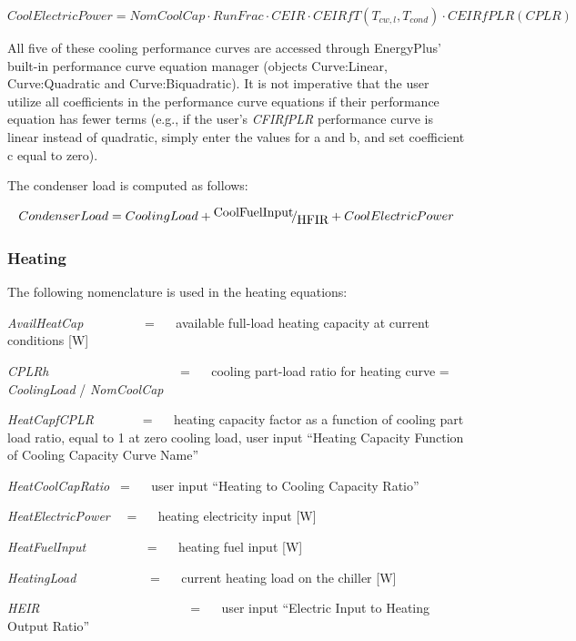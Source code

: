 \begin{equation}
CoolElectricPower = NomCoolCap \cdot RunFrac \cdot CEIR \cdot CEIRfT({T_{cw,l}},{T_{cond}}) \cdot CEIRfPLR(CPLR)
\end{equation}

All five of these cooling performance curves are accessed through EnergyPlus' built-in performance curve equation manager (objects Curve:Linear, Curve:Quadratic and Curve:Biquadratic). It is not imperative that the user utilize all coefficients in the performance curve equations if their performance equation has fewer terms (e.g., if the user's \emph{CFIRfPLR} performance curve is linear instead of quadratic, simply enter the values for a and b, and set coefficient c equal to zero).

The condenser load is computed as follows:

\begin{equation}
CondenserLoad = CoolingLoad + {\raise0.7ex\hbox{{CoolFuelInput}} \!\mathord{\left/ {\vphantom {{CoolFuelInput} {HFIR}}}\right.}\!\lower0.7ex\hbox{{HFIR}}} + CoolElectricPower
\end{equation}

\subsubsection{Heating}\label{heating}

The following nomenclature is used in the heating equations:

\emph{AvailHeatCap}~~~~~~~~~ = ~~ available full-load heating capacity at current conditions {[}W{]}

\emph{CPLRh}~~~~~~~~~~~~~~~~~~~~ = ~~ cooling part-load ratio for heating curve = \emph{CoolingLoad} / \emph{NomCoolCap}

\emph{HeatCapfCPLR}~~~~~~~ = ~~ heating capacity factor as a function of cooling part load ratio, equal to 1 at zero cooling load, user input ``Heating Capacity Function of Cooling Capacity Curve Name''

\emph{HeatCoolCapRatio~} = ~~ user input ``Heating to Cooling Capacity Ratio''

\emph{HeatElectricPower}~~ = ~~ heating electricity input {[}W{]}

\emph{HeatFuelInput}~~~~~~~~~ = ~~ heating fuel input {[}W{]}

\emph{HeatingLoad}~~~~~~~~~~~ = ~~ current heating load on the chiller {[}W{]}

\emph{HEIR}~~~~~~~~~~~~~~~~~~~~~~~ = ~~ user input ``Electric Input to Heating Output Ratio''

